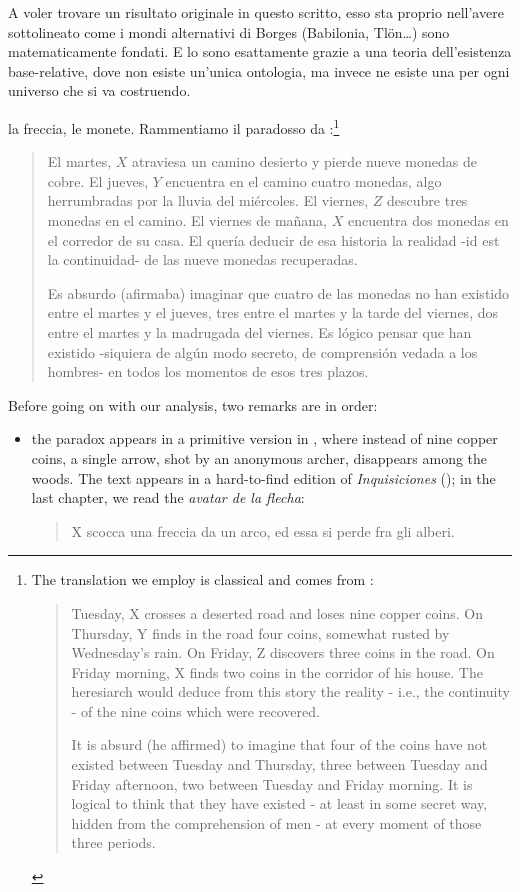A voler trovare un risultato originale in questo scritto, esso sta proprio nell'avere sottolineato come i mondi alternativi di Borges (Babilonia, Tl\"on\dots) sono matematicamente fondati. E lo sono esattamente grazie a una teoria dell'esistenza base-relative, dove non esiste un'unica ontologia, ma invece ne esiste una per ogni universo che si va costruendo.
\begin{example}
  la freccia, le monete. Rammentiamo il paradosso da \cite{}:\footnote{The translation we employ is classical and comes from \cite{}: 
  \begin{quote}
    \hspace{.5em} Tuesday, X crosses a deserted road and loses nine copper coins. On Thursday, Y finds in the road four coins, somewhat rusted by Wednesday's rain. On Friday, Z discovers three coins in the road. On Friday morning, X finds two coins in the corridor of his house. The heresiarch would deduce from this story the reality - i.e., the continuity - of the nine coins which were recovered. 
    
    \hspace{.5em} It is absurd (he affirmed) to imagine that four of the coins have not existed between Tuesday and Thursday, three between Tuesday and Friday afternoon, two between Tuesday and Friday morning. It is logical to think that they have existed - at least in some secret way, hidden from the comprehension of men - at every moment of those three periods. 
  \end{quote}}
  \begin{quote}
    El martes, $X$ atraviesa un camino desierto y pierde nueve monedas de cobre.
    El jueves, $Y$ encuentra en el camino cuatro monedas, algo herrumbradas por la lluvia del miércoles. El viernes, $Z$ descubre tres monedas en el camino. El viernes de mañana, $X$ encuentra dos monedas en el corredor de su casa. El  quería deducir de esa historia la realidad -id est la continuidad- de las nueve monedas recuperadas. 
    
    Es absurdo (afirmaba) imaginar que  cuatro de las monedas no han existido entre el martes y el jueves, tres entre el martes y la tarde del viernes, dos entre el martes y la madrugada del viernes. Es lógico pensar que han existido -siquiera de algún modo secreto, de comprensión vedada a los hombres- en todos los momentos de esos tres plazos.
  \end{quote}
  Before going on with our analysis, two remarks are in order:
  \begin{itemize}
    \item the paradox appears in a primitive version in \cite{}, where instead of nine copper coins, a single arrow, shot by an anonymous archer, disappears among the woods. The text appears in a hard-to-find edition of \emph{Inquisiciones} (\cite{}); in the last chapter, we read the \emph{avatar de la flecha}:
\begin{quote}
    X scocca una freccia da un arco, ed essa si perde fra gli alberi.
    

\end{quote}
\end{itemize}
\end{example}
